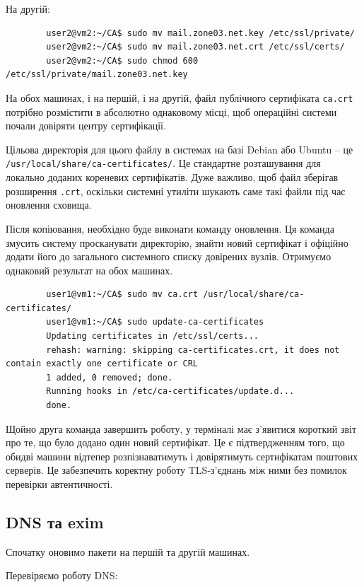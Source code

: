 \documentclass[14pt, a4paper]{extreport}
\begin{document}
	На другій:
	
	\begin{verbatim}
		user2@vm2:~/CA$ sudo mv mail.zone03.net.key /etc/ssl/private/
		user2@vm2:~/CA$ sudo mv mail.zone03.net.crt /etc/ssl/certs/
		user2@vm2:~/CA$ sudo chmod 600 /etc/ssl/private/mail.zone03.net.key
	\end{verbatim}
	
	На обох машинах, і на першій, і на другій, файл публічного сертифіката \texttt{ca.crt} потрібно розмістити в абсолютно однаковому місці, щоб операційні системи почали довіряти центру сертифікації.
	
	Цільова директорія для цього файлу в системах на базі Debian або Ubuntu -- це \texttt{/usr/local/share/ca-certificates/}. Це стандартне розташування для локально доданих кореневих сертифікатів. Дуже важливо, щоб файл зберігав розширення \texttt{.crt}, оскільки системні утиліти шукають саме такі файли під час оновлення сховища.
	
	Після копіювання, необхідно буде виконати команду оновлення. Ця команда змусить систему просканувати директорію, знайти новий сертифікат і офіційно додати його до загального системного списку довірених вузлів. Отримуємо однаковий результат на обох машинах.
	
	\begin{verbatim}
		user1@vm1:~/CA$ sudo mv ca.crt /usr/local/share/ca-certificates/
		user1@vm1:~/CA$ sudo update-ca-certificates
		Updating certificates in /etc/ssl/certs...
		rehash: warning: skipping ca-certificates.crt, it does not contain exactly one certificate or CRL
		1 added, 0 removed; done.
		Running hooks in /etc/ca-certificates/update.d...
		done.
	\end{verbatim}
	
	Щойно друга команда завершить роботу, у терміналі має з'явитися короткий звіт про те, що було додано один новий сертифікат. Це є підтвердженням того, що обидві машини відтепер розпізнаватимуть і довірятимуть сертифікатам поштових серверів. Це забезпечить коректну роботу TLS-з'єднань між ними без помилок перевірки автентичності.
	
	\subsection*{DNS та exim}
	
	Спочатку оновимо пакети на першій та другій машинах.
	
	
	Перевіряємо роботу DNS:
	
\end{document}
